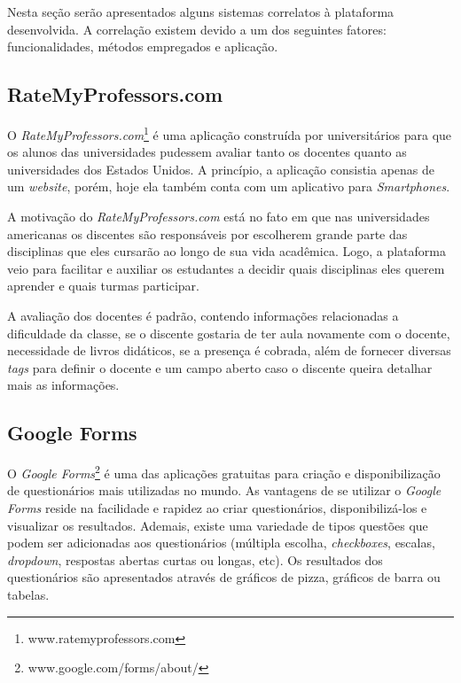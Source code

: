 \documentclass[
  12pt,       %
  openright,      %
  oneside,      %
  a4paper,      %
  english,      %
  french,        %
  spanish,     %
  brazil        %
  ]{abntex2-decsi}
\begin{document}
       Nesta seção serão apresentados alguns sistemas correlatos à plataforma desenvolvida. A correlação existem devido a um dos seguintes fatores: funcionalidades, métodos empregados e aplicação. 

        \subsection{RateMyProfessors.com}

        O \textit{RateMyProfessors.com}\footnote{www.ratemyprofessors.com} é uma aplicação construída por universitários para que os alunos das universidades pudessem avaliar tanto os docentes quanto as universidades dos Estados Unidos. A princípio, a aplicação consistia apenas de um \textit{website}, porém, hoje ela também conta com um aplicativo para \textit{Smartphones}. 

        A motivação do \textit{RateMyProfessors.com} está no fato em que nas universidades americanas os discentes são responsáveis por escolherem grande parte das disciplinas que eles cursarão ao longo de sua vida acadêmica. Logo, a plataforma veio para facilitar e auxiliar os estudantes a decidir quais disciplinas eles querem aprender e quais turmas participar.

        A avaliação dos docentes é padrão, contendo informações relacionadas a dificuldade da classe, se o discente gostaria de ter aula novamente com o docente, necessidade de livros didáticos, se a presença é cobrada, além de fornecer diversas \textit{tags} para definir o docente e um campo aberto caso o discente queira detalhar mais as informações.

        \subsection{Google Forms}

        O \textit{Google Forms}\footnote{www.google.com/forms/about/} é uma das aplicações gratuitas para criação e disponibilização de questionários mais utilizadas no mundo. As vantagens de se utilizar o \textit{Google Forms} reside na facilidade e rapidez ao criar questionários, disponibilizá-los e visualizar os resultados. Ademais, existe uma variedade de tipos questões que podem ser adicionadas aos questionários (múltipla escolha, \textit{checkboxes}, escalas, \textit{dropdown}, respostas abertas curtas ou longas, etc). Os resultados dos questionários são apresentados através de gráficos de pizza, gráficos de barra ou tabelas. 
\end{document}

